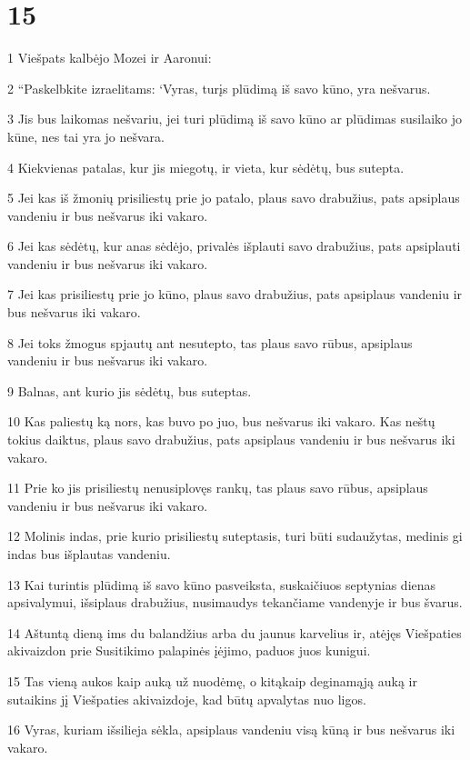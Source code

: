 \chapter{15}

\par 1 Viešpats kalbėjo Mozei ir Aaronui: 
\par 2 “Paskelbkite izraelitams: ‘Vyras, turįs plūdimą iš savo kūno, yra nešvarus. 
\par 3 Jis bus laikomas nešvariu, jei turi plūdimą iš savo kūno ar plūdimas susilaiko jo kūne, nes tai yra jo nešvara. 
\par 4 Kiekvienas patalas, kur jis miegotų, ir vieta, kur sėdėtų, bus sutepta. 
\par 5 Jei kas iš žmonių prisiliestų prie jo patalo, plaus savo drabužius, pats apsiplaus vandeniu ir bus nešvarus iki vakaro. 
\par 6 Jei kas sėdėtų, kur anas sėdėjo, privalės išplauti savo drabužius, pats apsiplauti vandeniu ir bus nešvarus iki vakaro. 
\par 7 Jei kas prisiliestų prie jo kūno, plaus savo drabužius, pats apsiplaus vandeniu ir bus nešvarus iki vakaro. 
\par 8 Jei toks žmogus spjautų ant nesutepto, tas plaus savo rūbus, apsiplaus vandeniu ir bus nešvarus iki vakaro. 
\par 9 Balnas, ant kurio jis sėdėtų, bus suteptas. 
\par 10 Kas paliestų ką nors, kas buvo po juo, bus nešvarus iki vakaro. Kas neštų tokius daiktus, plaus savo drabužius, pats apsiplaus vandeniu ir bus nešvarus iki vakaro. 
\par 11 Prie ko jis prisiliestų nenusiplovęs rankų, tas plaus savo rūbus, apsiplaus vandeniu ir bus nešvarus iki vakaro. 
\par 12 Molinis indas, prie kurio prisiliestų suteptasis, turi būti sudaužytas, medinis gi indas bus išplautas vandeniu. 
\par 13 Kai turintis plūdimą iš savo kūno pasveiksta, suskaičiuos septynias dienas apsivalymui, išsiplaus drabužius, nusimaudys tekančiame vandenyje ir bus švarus. 
\par 14 Aštuntą dieną ims du balandžius arba du jaunus karvelius ir, atėjęs Viešpaties akivaizdon prie Susitikimo palapinės įėjimo, paduos juos kunigui. 
\par 15 Tas vieną aukos kaip auką už nuodėmę, o kitą­kaip deginamąją auką ir sutaikins jį Viešpaties akivaizdoje, kad būtų apvalytas nuo ligos. 
\par 16 Vyras, kuriam išsilieja sėkla, apsiplaus vandeniu visą kūną ir bus nešvarus iki vakaro. 
